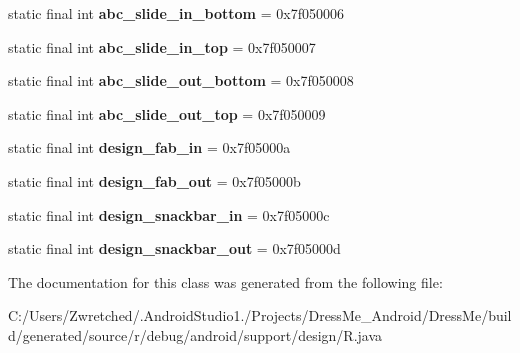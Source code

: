 \begin{DoxyCompactItemize}
\item 
\hypertarget{classandroid_1_1support_1_1design_1_1_r_1_1anim_a7de45fdd3717db19f19d80482c3cdbf5}{}static final int {\bfseries abc\+\_\+slide\+\_\+in\+\_\+bottom} = 0x7f050006\label{classandroid_1_1support_1_1design_1_1_r_1_1anim_a7de45fdd3717db19f19d80482c3cdbf5}

\item 
\hypertarget{classandroid_1_1support_1_1design_1_1_r_1_1anim_a8b800ace39e4bfc75cc8f15bec2ea3e4}{}static final int {\bfseries abc\+\_\+slide\+\_\+in\+\_\+top} = 0x7f050007\label{classandroid_1_1support_1_1design_1_1_r_1_1anim_a8b800ace39e4bfc75cc8f15bec2ea3e4}

\item 
\hypertarget{classandroid_1_1support_1_1design_1_1_r_1_1anim_a39e216575b2d8d55ee799f74ccabf405}{}static final int {\bfseries abc\+\_\+slide\+\_\+out\+\_\+bottom} = 0x7f050008\label{classandroid_1_1support_1_1design_1_1_r_1_1anim_a39e216575b2d8d55ee799f74ccabf405}

\item 
\hypertarget{classandroid_1_1support_1_1design_1_1_r_1_1anim_add316245c738f2bbdc588fcd7b8673fe}{}static final int {\bfseries abc\+\_\+slide\+\_\+out\+\_\+top} = 0x7f050009\label{classandroid_1_1support_1_1design_1_1_r_1_1anim_add316245c738f2bbdc588fcd7b8673fe}

\item 
\hypertarget{classandroid_1_1support_1_1design_1_1_r_1_1anim_aec11ee5d8fd2087a88b6fac22cf33d7c}{}static final int {\bfseries design\+\_\+fab\+\_\+in} = 0x7f05000a\label{classandroid_1_1support_1_1design_1_1_r_1_1anim_aec11ee5d8fd2087a88b6fac22cf33d7c}

\item 
\hypertarget{classandroid_1_1support_1_1design_1_1_r_1_1anim_afa8c47c7f178db983e2aa639553342ca}{}static final int {\bfseries design\+\_\+fab\+\_\+out} = 0x7f05000b\label{classandroid_1_1support_1_1design_1_1_r_1_1anim_afa8c47c7f178db983e2aa639553342ca}

\item 
\hypertarget{classandroid_1_1support_1_1design_1_1_r_1_1anim_a9930bdac625232a9e03a5a9746dd8380}{}static final int {\bfseries design\+\_\+snackbar\+\_\+in} = 0x7f05000c\label{classandroid_1_1support_1_1design_1_1_r_1_1anim_a9930bdac625232a9e03a5a9746dd8380}

\item 
\hypertarget{classandroid_1_1support_1_1design_1_1_r_1_1anim_acf11f1948085305ee3c0caf4c4a043c3}{}static final int {\bfseries design\+\_\+snackbar\+\_\+out} = 0x7f05000d\label{classandroid_1_1support_1_1design_1_1_r_1_1anim_acf11f1948085305ee3c0caf4c4a043c3}

\end{DoxyCompactItemize}


The documentation for this class was generated from the following file\+:\begin{DoxyCompactItemize}
\item 
C\+:/\+Users/\+Zwretched/.\+Android\+Studio1./\+Projects/\+Dress\+Me\+\_\+\+Android/\+Dress\+Me/build/generated/source/r/debug/android/support/design/R.\+java\end{DoxyCompactItemize}
